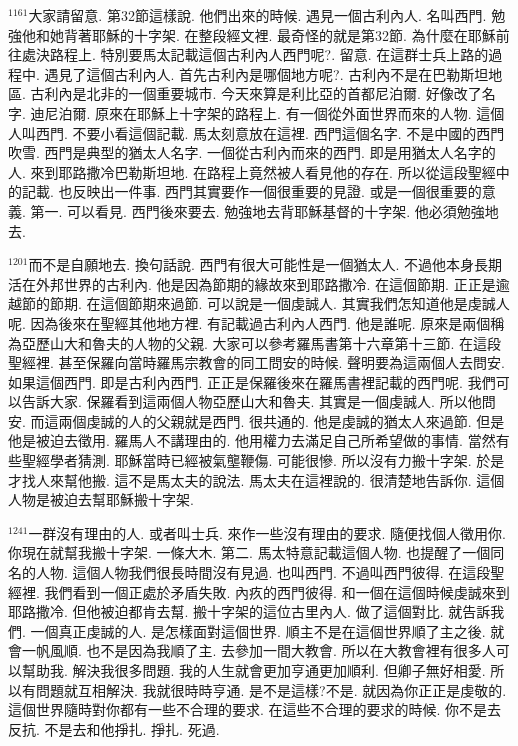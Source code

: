 \documentclass{book}
\begin{document}
$^{1161}$大家請留意.
第32節這樣說.
他們出來的時候.
遇見一個古利內人.
名叫西門.
勉強他和她背著耶穌的十字架.
在整段經文裡.
最奇怪的就是第32節.
為什麼在耶穌前往處決路程上.
特別要馬太記載這個古利內人西門呢?.
留意.
在這群士兵上路的過程中.
遇見了這個古利內人.
首先古利內是哪個地方呢?.
古利內不是在巴勒斯坦地區.
古利內是北非的一個重要城市.
今天來算是利比亞的首都尼泊爾.
好像改了名字.
迪尼泊爾.
原來在耶穌上十字架的路程上.
有一個從外面世界而來的人物.
這個人叫西門.
不要小看這個記載.
馬太刻意放在這裡.
西門這個名字.
不是中國的西門吹雪.
西門是典型的猶太人名字.
一個從古利內而來的西門.
即是用猶太人名字的人.
來到耶路撒冷巴勒斯坦地.
在路程上竟然被人看見他的存在.
所以從這段聖經中的記載.
也反映出一件事.
西門其實要作一個很重要的見證.
或是一個很重要的意義.
第一.
可以看見.
西門後來要去.
勉強地去背耶穌基督的十字架.
他必須勉強地去.

$^{1201}$而不是自願地去.
換句話說.
西門有很大可能性是一個猶太人.
不過他本身長期活在外邦世界的古利內.
他是因為節期的緣故來到耶路撒冷.
在這個節期.
正正是逾越節的節期.
在這個節期來過節.
可以說是一個虔誠人.
其實我們怎知道他是虔誠人呢.
因為後來在聖經其他地方裡.
有記載過古利內人西門.
他是誰呢.
原來是兩個稱為亞歷山大和魯夫的人物的父親.
大家可以參考羅馬書第十六章第十三節.
在這段聖經裡.
甚至保羅向當時羅馬宗教會的同工問安的時候.
聲明要為這兩個人去問安.
如果這個西門.
即是古利內西門.
正正是保羅後來在羅馬書裡記載的西門呢.
我們可以告訴大家.
保羅看到這兩個人物亞歷山大和魯夫.
其實是一個虔誠人.
所以他問安.
而這兩個虔誠的人的父親就是西門.
很共通的.
他是虔誠的猶太人來過節.
但是他是被迫去徵用.
羅馬人不講理由的.
他用權力去滿足自己所希望做的事情.
當然有些聖經學者猜測.
耶穌當時已經被氣壟鞭傷.
可能很慘.
所以沒有力搬十字架.
於是才找人來幫他搬.
這不是馬太夫的說法.
馬太夫在這裡說的.
很清楚地告訴你.
這個人物是被迫去幫耶穌搬十字架.

$^{1241}$一群沒有理由的人.
或者叫士兵.
來作一些沒有理由的要求.
隨便找個人徵用你.
你現在就幫我搬十字架.
一條大木.
第二.
馬太特意記載這個人物.
也提醒了一個同名的人物.
這個人物我們很長時間沒有見過.
也叫西門.
不過叫西門彼得.
在這段聖經裡.
我們看到一個正處於矛盾失敗.
內疚的西門彼得.
和一個在這個時候虔誠來到耶路撒冷.
但他被迫都肯去幫.
搬十字架的這位古里內人.
做了這個對比.
就告訴我們.
一個真正虔誠的人.
是怎樣面對這個世界.
順主不是在這個世界順了主之後.
就會一帆風順.
也不是因為我順了主.
去參加一間大教會.
所以在大教會裡有很多人可以幫助我.
解決我很多問題.
我的人生就會更加亨通更加順利.
但卿子無好相愛.
所以有問題就互相解決.
我就很時時亨通.
是不是這樣?不是.
就因為你正正是虔敬的.
這個世界隨時對你都有一些不合理的要求.
在這些不合理的要求的時候.
你不是去反抗.
不是去和他掙扎.
掙扎.
死過.
\end{document}
